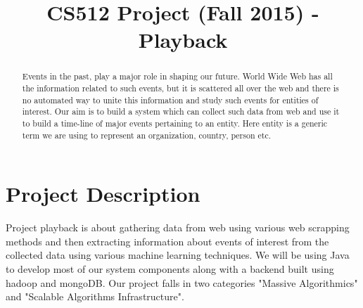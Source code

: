 \documentclass[10pt,conference]{IEEEtran}
\begin{document}
\title{CS512 Project (Fall 2015) - Playback}

\author{%
\and
{}
\and
{}
}

\maketitle
\begin{abstract}
\textnormal{Events in the past, play a major role in shaping our future. World Wide Web has
all the information related to such events, but it is scattered all over the
web and there is no automated way to unite this information and study such
events for entities of interest. Our aim is to build a system which can collect
such data from web and use it to build a time-line of major events pertaining
to an entity. Here entity is a generic term we are using to represent an
organization, country, person etc.}
\end{abstract}

\IEEEpeerreviewmaketitle

\section{Project Description}\label{sec:project-description}

Project playback is about gathering data from web using various web scrapping
methods and then extracting information about events of interest from the
collected data using various machine learning techniques. We will be using Java
to develop most of our system components along with a backend built using
hadoop and mongoDB. Our project falls in two categories "Massive Algorithmics"
and "Scalable Algorithms Infrastructure".
\end{document}

